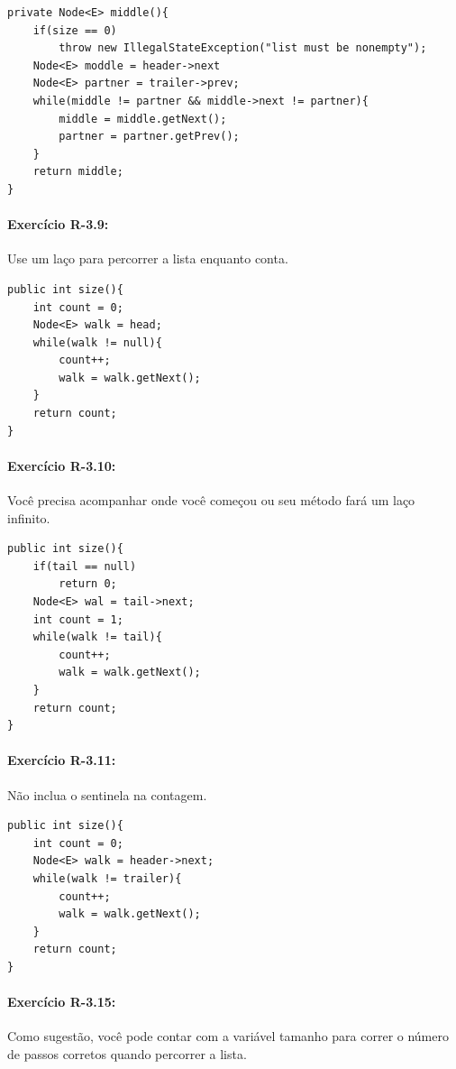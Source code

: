 \begin{lstlisting}[frame=single]
private Node<E> middle(){
	if(size == 0)
		throw new IllegalStateException("list must be nonempty");
	Node<E> moddle = header->next
	Node<E> partner = trailer->prev;
	while(middle != partner && middle->next != partner){
		middle = middle.getNext();
		partner = partner.getPrev();
	}
	return middle;
}
\end{lstlisting}

\paragraph{Exercício R-3.9:}
Use um laço para percorrer a lista enquanto conta.

\begin{lstlisting}[frame=single]
public int size(){
	int count = 0;
	Node<E> walk = head;
	while(walk != null){
		count++;
		walk = walk.getNext();
	}
	return count;
}
\end{lstlisting}

\paragraph{Exercício R-3.10:}
Você precisa acompanhar onde você começou ou seu método fará um laço infinito.

\begin{lstlisting}[frame=single]
public int size(){
	if(tail == null)
		return 0;
	Node<E> wal = tail->next;
	int count = 1;
	while(walk != tail){
		count++;
		walk = walk.getNext();
	}
	return count;
}
\end{lstlisting}

\paragraph{Exercício R-3.11:}
Não inclua o sentinela na contagem.

\begin{lstlisting}[frame=single]
public int size(){
	int count = 0;
	Node<E> walk = header->next;
	while(walk != trailer){
		count++;
		walk = walk.getNext();
	}
	return count;
}
\end{lstlisting}

\paragraph{Exercício R-3.15:}
Como sugestão, você pode contar com a variável tamanho para correr o número de passos corretos quando percorrer a lista.

